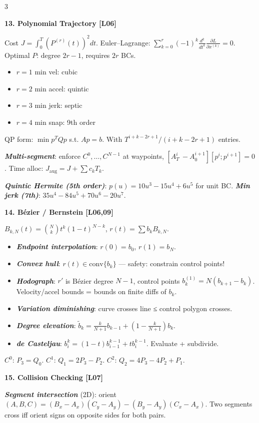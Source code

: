 \documentclass[8pt,a4paper,landscape]{extarticle}
\newcommand{\sect}[1]{\vspace{1pt}\colorbox{black!10}{\parbox{\linewidth}{\textbf{\footnotesize #1}}}\vspace{1pt}}
\newcommand{\sub}[1]{\textbf{\textit{#1}}}
\begin{document}
\begin{multicols*}{3}
\sect{13. Polynomial Trajectory \hfill {\scriptsize[L06]}}
Cost $J=\int_0^T (P^{(r)}(t))^2 dt$.
Euler–Lagrange: $\sum_{k=0}^r(-1)^k\tfrac{d^k}{dt^k}\tfrac{\partial L}{\partial x^{(k)}}=0$.
Optimal $P$: degree $2r-1$, requires $2r$ BCs.
\begin{itemize}
\item $r=1$ min vel: cubic
\item $r=2$ min accel: quintic
\item $r=3$ min jerk: septic
\item $r=4$ min snap: 9th order
\end{itemize}

QP form: $\min p^T Q p$ s.t. $Ap=b$. With $T^{i+k-2r+1}/(i+k-2r+1)$ entries.

\sub{Multi-segment}: enforce $C^0,\dots,C^{N-1}$ at waypoints, $[A_T^i\ -A_0^{i+1}][p^i;p^{i+1}]=0$. Time alloc: $J_{\text{aug}}=J+\sum c_k T_k$.

\sub{Quintic Hermite (5th order)}: $p(u)=10u^3-15u^4+6u^5$ for unit BC.
\sub{Min jerk (7th)}: $35u^4-84u^5+70u^6-20u^7$.

\sect{14. Bézier / Bernstein \hfill {\scriptsize[L06,09]}}
$B_{k,N}(t)=\binom{N}{k}t^k(1-t)^{N-k}$, $r(t)=\sum b_k B_{k,N}$.
\begin{itemize}
\item \sub{Endpoint interpolation}: $r(0)=b_0$, $r(1)=b_N$.
\item \sub{Convex hull}: $r(t)\in\text{conv}\{b_k\}$ — safety: constrain control points!
\item \sub{Hodograph}: $r'$ is Bézier degree $N-1$, control points $b_k^{(1)}=N(b_{k+1}-b_k)$. Velocity/accel bounds = bounds on finite diffs of $b_k$.
\item \sub{Variation diminishing}: curve crosses line ≤ control polygon crosses.
\item \sub{Degree elevation}: $\tilde b_k=\tfrac{k}{N+1}b_{k-1}+(1-\tfrac{k}{N+1})b_k$.
\item \sub{de Casteljau}: $b_i^k=(1-t)b_{i-1}^{k-1}+t b_i^{k-1}$. Evaluate + subdivide.
\end{itemize}

$C^0$: $P_3=Q_0$.
$C^1$: $Q_1=2P_3-P_2$.
$C^2$: $Q_2=4P_3-4P_2+P_1$.

\sect{15. Collision Checking \hfill {\scriptsize[L07]}}
\sub{Segment intersection} (2D): orient$(A,B,C)=(B_x-A_x)(C_y-A_y)-(B_y-A_y)(C_x-A_x)$. Two segments cross iff orient signs on opposite sides for both pairs.


\end{multicols*}
\end{document}
